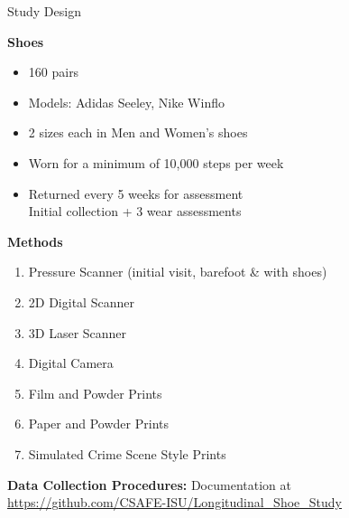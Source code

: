 \documentclass[landscape, a0paper, fontscale=0.275, margin = 30mm]{baposter} %
\newcommand{\headercolorbox}[4]{%
  \begin{posterbox}[#3,borderColor=#2,headerColorOne=#2,headerColorTwo=#2]{#1}
    #4
  \end{posterbox}
}
\begin{document}
\begin{poster}
\headercolorbox{Study Design}{csafelightblue}{name=objectives,column=0,row=0}{
{\bf Shoes}
\begin{itemize}
\item 160 pairs
\item Models: Adidas Seeley, Nike Winflo
\item 2 sizes each in Men and Women's shoes
\item Worn for a minimum of 10,000 steps per week
\item Returned every 5 weeks for assessment\\Initial collection + 3 wear assessments
\end{itemize}
\vspace{.5em}
{\bf Methods}
\begin{enumerate}
\item Pressure Scanner {\small(initial visit, barefoot \& with shoes)}
\item 2D Digital Scanner
\item 3D Laser Scanner
\item Digital Camera
\item Film and Powder Prints
\item Paper and Powder Prints
\item Simulated Crime Scene Style Prints
\end{enumerate}
\vspace{.5em}
{\bf Data Collection Procedures:}
Documentation at \\{\small\url{https://github.com/CSAFE-ISU/Longitudinal_Shoe_Study}}
}



\end{poster}
\end{document}
